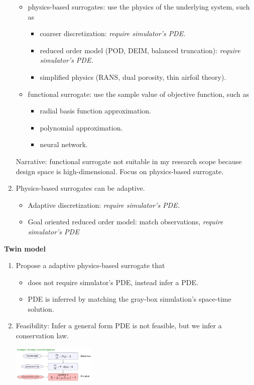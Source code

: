 \documentclass[a4paper,onecolumn]{article}
\theoremstyle{remark}
\begin{document}
\begin{enumerate}
          \begin{itemize}
              \item physics-based surrogates: use the physics of the underlying system, such as
                    \begin{itemize}
                        \item coarser discretization: \emph{require simulator's PDE.}
                        \item reduced order model (POD, DEIM, balanced truncation): \emph{require simulator's PDE.}
                        \item simplified physics (RANS, dual porosity, thin airfoil theory).
                    \end{itemize}
              \item functional surrogate: use the sample value of objective function, such as
                    \begin{itemize}
                        \item radial basis function approximation.
                        \item polynomial approximation.
                        \item neural network.
                    \end{itemize}
          \end{itemize}
          Narrative: functional surrogate not suitable in my research scope because design space is high-dimensional. Focus on physics-based surrogate.
    \item Physics-based surrogates can be adaptive.
          \begin{itemize}
              \item Adaptive discretization: \emph{require simulator's PDE.}
              \item Goal oriented reduced order model: match observations, \emph{require simulator's PDE}
          \end{itemize}
\end{enumerate}

\newpage
\textbf{Twin model}
\begin{enumerate}
    \item Propose a adaptive physics-based surrogate that 
          \begin{itemize}
              \item does not require simulator's PDE, instead infer a PDE.
              \item PDE is inferred by matching the gray-box simulation's space-time solution.
          \end{itemize}
    \item Feasibility:
          Infer a general form PDE is not feasible, but we infer a conservation law.\\
          \begin{center}\includegraphics[width=4cm]{three_box.png}\end{center}
\end{enumerate}
\end{document}
